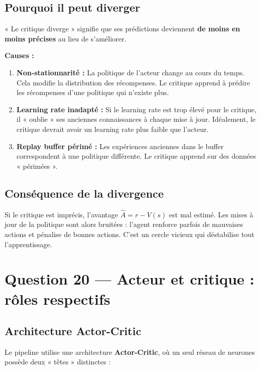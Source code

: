 \documentclass[11pt,a4paper]{article}
\begin{document}
\subsection{Pourquoi il peut diverger}

« Le critique diverge » signifie que ses prédictions deviennent \textbf{de moins en moins précises} au lieu de s'améliorer.

\textbf{Causes :}
\begin{enumerate}
    \item \textbf{Non-stationnarité :} La politique de l'acteur change au cours du temps. Cela modifie la distribution des récompenses. Le critique apprend à prédire les récompenses d'une politique qui n'existe plus.
    
    \item \textbf{Learning rate inadapté :} Si le learning rate est trop élevé pour le critique, il « oublie » ses anciennes connaissances à chaque mise à jour. Idéalement, le critique devrait avoir un learning rate plus faible que l'acteur.
    
    \item \textbf{Replay buffer périmé :} Les expériences anciennes dans le buffer correspondent à une politique différente. Le critique apprend sur des données « périmées ».
\end{enumerate}

\subsection{Conséquence de la divergence}

Si le critique est imprécis, l'avantage $\hat{A} = r - V(s)$ est mal estimé. Les mises à jour de la politique sont alors bruitées : l'agent renforce parfois de mauvaises actions et pénalise de bonnes actions. C'est un cercle vicieux qui déstabilise tout l'apprentissage.

\section{Question 20 — Acteur et critique : rôles respectifs}

\subsection{Architecture Actor-Critic}

Le pipeline utilise une architecture \textbf{Actor-Critic}, où un seul réseau de neurones possède deux « têtes » distinctes :
\end{document}
